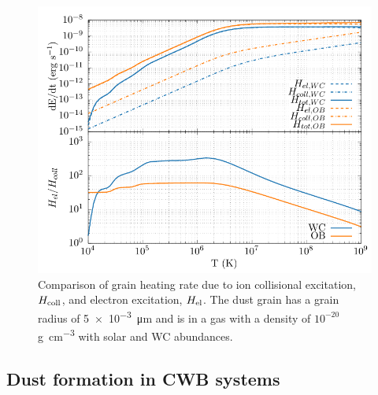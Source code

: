 \begin{figure}[h]
  \centering
  \includegraphics{assets/dust-electron-contribution/coll-el-comp.pdf}
  \caption[$H\rms{el}$ and $H\rms{coll}$ comparison]{Comparison of grain heating rate due to ion collisional excitation, $H\rms{coll}$, and electron excitation, $H\rms{el}$. The dust grain has a grain radius of \SI{5e-3}{\micro\metre} and is in a gas with a density of $10^{-20}$ \si{\gram\per\centi\metre\cubed} with solar and WC abundances.}
  \label{fig:collisionalheatingcomparison}
\end{figure}

\subsection{Dust formation in CWB systems}
\label{sec:cwbdust}

